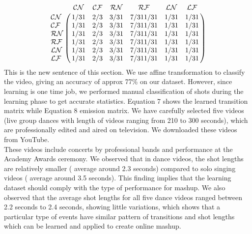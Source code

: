 \documentclass{sig-alternate}
\begin{document}
{{{$$
\bordermatrix{~ & \mathcal{CN} & \mathcal{CF}& \mathcal{RN}& \mathcal{RF}& \mathcal{LN}&\mathcal{LF} \cr
  \mathcal{CN} & 1/31 & 2/3& 3/31 &7/311/31&1/31&1/31\cr
  \mathcal{CF} &1/31 & 2/3& 3/31 &7/311/31&1/31&1/31 \cr
  \mathcal{RN} &1/31 & 2/3& 3/31 &7/311/31&1/31&1/31\cr
  \mathcal{RF} &1/31 & 2/3& 3/31 &7/311/31&1/31&1/31\cr
  \mathcal{LN} &1/31 & 2/3& 3/31 &7/311/31&1/31&1/31 \cr
  \mathcal{LF} &1/31 & 2/3& 3/31 &7/311/31&1/31&1/31 \cr
  }
$$
This is the new sentence of this section.
We use affine transformation to classify the video, giving an accuracy
of approx 77\% on our dataset. However, since learning is one
time job, we performed manual classification of shots during the
learning phase to get accurate statistics. Equation 7 shows the
learned transition matrix while Equation 8 emission matrix. We
have carefully selected five videos (live group dances with length
of videos ranging from 210 to 300 seconds), which are professionally
edited and aired on television. We downloaded these videos
from YouTube.\\
These videos include concerts by professional bands and performance
at the Academy Awards ceremony. We observed that
in dance videos, the shot lengths are relatively smaller ( average
around 2.3 seconds) compared to solo singing videos ( average
around 3.5 seconds). This finding implies that the learning dataset
should comply with the type of performance for mashup. We also
observed that the average shot lengths for all five dance videos
ranged between 2.2 seconds to 2.4 seconds, showing little variations,
which shows that a particular type of events have similar
pattern of transitions and shot lengths which can be learned and
applied to create online mashup.\\

}}}
\end{document}

